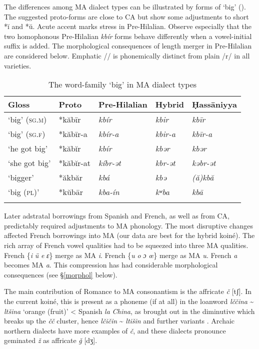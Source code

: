 \documentclass[output=paper]{langsci/langscibook}
\begin{document}
The differences among MA dialect types can be illustrated by forms of ‘big’ (). The suggested proto-forms are close to CA but show some adjustments to short *ĭ and *ŭ. Acute accent marks stress in Pre-Hilalian. Observe especially that the two homophonous Pre-Hilalian \textit{kbír} forms behave differently when a vowel-initial suffix is added. The morphological consequences of length merger in Pre-Hilalian are considered below. Emphatic /{\R}/ is phonemically distinct from plain /r/ in all varieties. 

\begin{table}
\caption{\label{tab:heath:1}\label{bkm:Ref13483830}The word-family `big' in MA dialect types}
\begin{tabular}{*{5}{l}}
\lsptoprule
{Gloss} & {\normalfont Proto} & {\normalfont Pre-Hilalian} & {\normalfont Hybrid} & {\normalfont Ḥassāniyya}\\\midrule
‘big’ (\textsc{sg.m}) & *kăbīr & \textit{kbír} & \textit{kbir} & \textit{kbīr}\\
‘big’ (\textsc{sg.f}) & *kăbīr-a & \textit{kbír-a} & \textit{kbir-a} & \textit{kbīr-a}\\
‘he got big’ & *kăbĭr & \textit{kbír} & \textit{kbər} & \textit{kbər}\\
‘she got big’ & *kăbĭr-at & \textit{kíbr-ət} & \textit{kbr-ət} & \textit{kəbr-ət}\\
‘bigger’ & *ăkbăr & \textit{kbá{\R}} & \textit{kbə{\R}} & \textit{(ă)kbă{\R}}\\
‘big (\textsc{pl})’ & *kŭbār & \textit{kba{\R}-ín} & \textit{kʷba{\R}} & \textit{kbā{\R}}\\
\lspbottomrule
\end{tabular}
\end{table}

Later adstratal borrowings from Spanish and French, as well as from CA, predictably required adjustments to MA phonology. The most disruptive changes affected French borrowings into MA (our data are best for the hybrid koiné). The rich array of French vowel qualities had to be squeezed into three MA qualities. French \{\textit{i} \textit{ü} \textit{e} \textit{ɛ}\} merge as MA \textit{i}. French \{\textit{u} \textit{o} \textit{ɔ} \textit{œ}\} merge as MA \textit{u}. French \textit{a} becomes MA \textit{a}. This compression has had considerable morphological consequences (see §\ref{morphol} below).

The main contribution of Romance to MA consonantism is the affricate \textit{č} [tʃ]. In the current koiné, this is present as a phoneme (if at all) in the loanword \textit{lččina} {\textasciitilde} \textit{ltšina} ‘orange (fruit)’ < Spanish \textit{la} \textit{China}, as brought out in the diminutive which breaks up the \textit{čč} cluster, hence \textit{lčičin} {\textasciitilde} \textit{ltišin} and further variants \citep{Heath1999}. Archaic northern dialects have more examples of \textit{č}, and these dialects pronounce geminated \textit{ž} as affricate \textit{ǧ} [dʒ].
\end{document}
